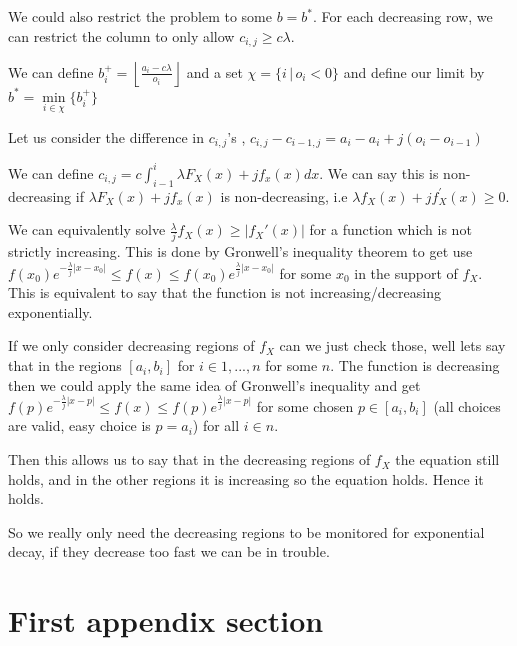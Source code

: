 \documentclass[a4paper,10pt]{article}
\newcommand{\floor}[1]{\left \lfloor #1 \right \rfloor}
\theoremstyle{definition}
\theoremstyle{definition}
\theoremstyle{remark}
\theoremstyle{definition}
\begin{document}
We could also restrict the problem to some $b=b^{*}$. For each decreasing row, we can restrict the column to only allow $c_{i,j} \geq c \lambda$.

We can define $b_{i}^{+}=\floor{\frac{a_{i}-c \lambda}{o_{i}}}$ and a set $\chi=\{i \, | \, o_{i}<0 \}$ and define our limit by $b^{*}=\min\limits_{i \in \chi} \{b_{i}^{+} \}$

Let us consider the difference in $c_{i,j}$'s , $c_{i,j}-c_{i-1,j}=a_{i}-a_{i}+j(o_{i}-o_{i-1})$

We can define $c_{i,j}=c \int_{i-1}^{i} \lambda F_{X}(x)+j f_{x}(x) dx$. We can say this is non-decreasing if $\lambda F_{X}(x)+ j f_{x}(x)$ is non-decreasing, i.e $\lambda f_{X}(x) + j f^{'}_{{X}}(x) \geq 0$.


We can equivalently solve $\frac{\lambda}{j}f_{X}(x) \geq |f_{X}'(x)|$ for a function which is not strictly increasing. This is done by Gronwell's inequality theorem to get use $f(x_{0})e^{-\frac{\lambda}{j}|x-x_{0}|} \leq f(x) \leq f(x_{0})e^{\frac{\lambda}{j}|x-x_{0}|}$ for some $x_{0}$ in the support of $f_{X}$. This is equivalent to say that the function is not increasing/decreasing exponentially.

If we only consider decreasing regions of $f_{X}$ can we just check those, well lets say that in the regions $[a_{i},b_{i}]$ for $i \in {1,...,n}$ for some $n$. The function is decreasing then we could apply the same idea of Gronwell's inequality and get $f(p)e^{-\frac{\lambda}{j}|x-p|} \leq f(x) \leq f(p)e^{\frac{\lambda}{j}|x-p|}$ for some chosen $p \in [a_{i},b_{i}]$ (all choices are valid, easy choice is $p=a_{i}$) for all $i \in n$.

Then this allows us to say that in the decreasing regions of $f_{X}$ the equation still holds, and in the other regions it is increasing so the equation holds. Hence it holds.

So we really only need the decreasing regions to be monitored for exponential decay, if they decrease too fast we can be in trouble.
  





\newpage
\appendix
{}
\appendixpage
\addappheadtotoc
\section{First appendix section}
\end{document}
